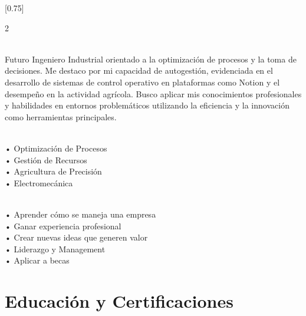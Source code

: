 \documentclass[lighthipster]{simplehipstercv}
\begin{document}
\setlength{\columnsep}{1.5cm}
[0.75]
\begin{paracol}{2}

\paracolbackgroundoptions

\footnotesize
{\setasidefontcolour
\flushright
\begin{center}

\end{center}



\bigskip

\\[0.5em]
Futuro Ingeniero Industrial orientado a la optimización de procesos y la toma de decisiones. Me destaco por mi capacidad de autogestión, evidenciada en el desarrollo de sistemas de control operativo en plataformas como Notion y el desempeño en la actividad agrícola. Busco aplicar mis conocimientos profesionales y habilidades en entornos problemáticos utilizando la eficiencia y la innovación como herramientas principales.

\bigskip

 \\[0.5em]
• Optimización de Procesos \\
• Gestión de Recursos \\
• Agricultura de Precisión \\
• Electromecánica

\bigskip

\\[0.5em]
• Aprender cómo se maneja una empresa \\
• Ganar experiencia profesional \\
• Crear nuevas ideas que generen valor \\
• Liderazgo y Management \\
• Aplicar a becas 

\vspace{4em}



\phantom{turn the page}
\phantom{turn the page}
}
\switchcolumn

\small
\section*{Educación y Certificaciones}


\end{paracol}
\end{document}
